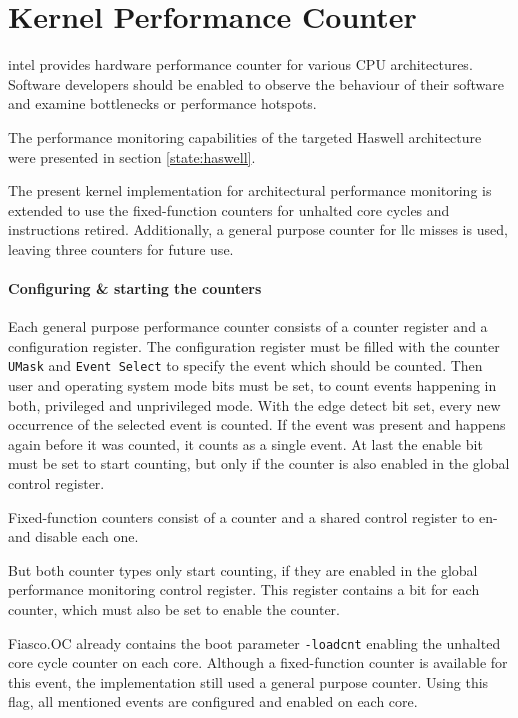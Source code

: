 \section{Kernel Performance Counter}
\label{impl:perfcounter}

\gls{intel} provides hardware performance counter for various CPU
architectures.
Software developers should be enabled to observe the behaviour of their
software and examine bottlenecks or performance hotspots.

The performance monitoring capabilities of the targeted Haswell architecture
were presented in section \ref{state:haswell}.

The present kernel implementation for architectural performance monitoring is
extended to use the fixed-function counters for unhalted core cycles and
instructions retired.
Additionally, a general purpose counter for \gls{llc} misses is used,
leaving three counters for future use.

\paragraph{Configuring \& starting the counters}
Each general purpose performance counter consists of a counter register and a
configuration register.
The configuration register must be filled with the counter \texttt{UMask} and
\texttt{Event Select} to specify the event which should be counted.
Then user and operating system mode bits must be set, to count events happening
in both, privileged and unprivileged mode.
With the edge detect bit set, every new occurrence of the selected event is
counted.
If the event was present and happens again before it was counted, it counts as
a single event.
At last the enable bit must be set to start counting, but only if the counter
is also enabled in the global control register.

Fixed-function counters consist of a counter and a shared control register to
en- and disable each one.

But both counter types only start counting, if they are enabled in the global
performance monitoring control register.
This register contains a bit for each counter, which must also be set to enable
the counter.

Fiasco.OC already contains the boot parameter \texttt{-loadcnt} enabling the
unhalted core cycle counter on each core.
Although a fixed-function counter is available for this event, the
implementation still used a general purpose counter.
Using this flag, all mentioned events are configured and enabled on each core.

